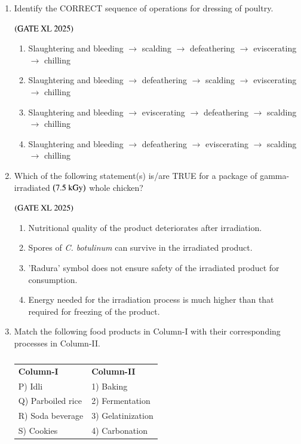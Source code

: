 \documentclass[journal]{IEEEtran}
\begin{document}
\begin{enumerate}
    \item Identify the CORRECT sequence of operations for dressing of poultry.

    \hfill $\left(\text{GATE XL 2025}\right)$
    \begin{enumerate}
        \item Slaughtering and bleeding $\rightarrow$ scalding $\rightarrow$ defeathering $\rightarrow$ eviscerating $\rightarrow$ chilling
        \item Slaughtering and bleeding $\rightarrow$ defeathering $\rightarrow$ scalding $\rightarrow$ eviscerating $\rightarrow$ chilling
        \item Slaughtering and bleeding $\rightarrow$ eviscerating $\rightarrow$ defeathering $\rightarrow$ scalding $\rightarrow$ chilling
        \item Slaughtering and bleeding $\rightarrow$ defeathering $\rightarrow$ eviscerating $\rightarrow$ scalding $\rightarrow$ chilling
    \end{enumerate}

    \item Which of the following statement(s) is/are TRUE for a package of gamma-irradiated $\brak{7.5\ \text{kGy}}$ whole chicken?

    \hfill $\left(\text{GATE XL 2025}\right)$
    \begin{enumerate}
        \item Nutritional quality of the product deteriorates after irradiation.
        \item Spores of \textit{C. botulinum} can survive in the irradiated product.
        \item 'Radura' symbol does not ensure safety of the irradiated product for consumption.
        \item Energy needed for the irradiation process is much higher than that required for freezing of the product.
    \end{enumerate}

    \item Match the following food products in Column-I with their corresponding processes in Column-II.

    \begin{table}[H]
        \centering
        \begin{tabular}{ll}
            \textbf{Column-I} & \textbf{Column-II} \\
            P) Idli & 1) Baking \\
            Q) Parboiled rice & 2) Fermentation \\
            R) Soda beverage & 3) Gelatinization \\
            S) Cookies & 4) Carbonation \\
        \end{tabular}
        \caption*{}
        \label{tab:xl2025_q118}
    \end{table}


\end{enumerate}
\end{document}
